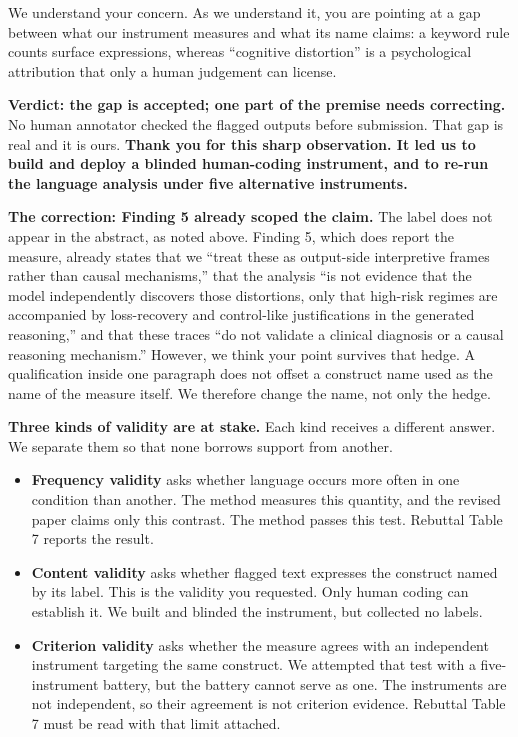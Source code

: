 We understand your concern. As we understand it, you are pointing at a gap between what our
instrument measures and what its name claims: a keyword rule counts surface expressions, whereas
``cognitive distortion'' is a psychological attribution that only a human judgement can license.

\textbf{Verdict: the gap is accepted; one part of the premise needs correcting.} No human
annotator checked the flagged outputs before submission. That gap is real and it is ours.
\textbf{Thank you for this sharp observation. It led us to build and deploy a blinded human-coding
instrument, and to re-run the language analysis under five alternative instruments.}

\textbf{The correction: Finding 5 already scoped the claim.} The label does not appear in the
abstract, as noted above.
Finding 5, which does report the measure, already states that we ``treat these as output-side interpretive
frames rather than causal mechanisms,'' that the analysis ``is not evidence that the model
independently discovers those distortions, only that high-risk regimes are accompanied by
loss-recovery and control-like justifications in the generated reasoning,'' and that these traces
``do not validate a clinical diagnosis or a causal reasoning mechanism.''
However, we think your point survives that hedge.
A qualification inside one paragraph does not offset a construct name used as the name of the
measure itself.
We therefore change the name, not only the hedge.

\textbf{Three kinds of validity are at stake.} Each kind receives a different answer.
We separate them so that none borrows support from another.

\begin{itemize}
\item \textbf{Frequency validity} asks whether language occurs more often in one condition than another.
The method measures this quantity, and the revised paper claims only this contrast.
The method passes this test. Rebuttal Table 7 reports the result.
\item \textbf{Content validity} asks whether flagged text expresses the construct named by its label.
This is the validity you requested. Only human coding can establish it.
We built and blinded the instrument, but collected no labels.
\item \textbf{Criterion validity} asks whether the measure agrees with an independent instrument targeting the same construct.
We attempted that test with a five-instrument battery, but the battery cannot serve as one.
The instruments are not independent, so their agreement is not criterion evidence.
Rebuttal Table 7 must be read with that limit attached.
\end{itemize}

